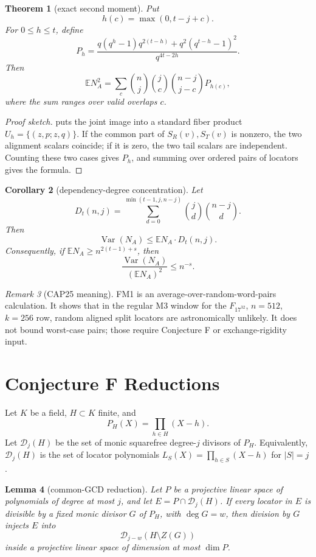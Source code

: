 \documentclass[11pt]{article}
\newtheorem{theorem}{Theorem}[section]
\newtheorem{lemma}[theorem]{Lemma}
\newtheorem{corollary}[theorem]{Corollary}
\theoremstyle{definition}
\theoremstyle{remark}
\newtheorem{remark}[theorem]{Remark}
\newcommand{\D}{\mathcal D}
\newcommand{\E}{\mathbb E}
\newcommand{\Var}{\operatorname{Var}}
\begin{document}
\begin{theorem}[exact second moment]\label{thm:second-moment}
Put
\[
        h(c)=\max(0,t-j+c).
\]
For $0\le h\le t$, define
\[
P_h=
\frac{q(q^h-1)q^{2(t-h)}+q^2(q^{t-h}-1)^2}{q^{4t-2h}}.
\]
Then
\[
\E N_A^2
=
\sum_c
\binom{n}{j}\binom{j}{c}\binom{n-j}{j-c}
P_{h(c)},
\]
where the sum ranges over valid overlaps $c$.
\end{theorem}

\begin{proof}[Proof sketch]
 puts the joint image into a standard fiber product
$U_h=\{(z,p;z,q)\}$.  If the common part of $S_R(v),S_T(v)$ is nonzero, the two
alignment scalars coincide; if it is zero, the two tail scalars are independent.
Counting these two cases gives $P_h$, and summing over ordered pairs of
locators gives the formula.
\end{proof}

\begin{corollary}[dependency-degree concentration]\label{cor:dependency}
Let
\[
        D_t(n,j)=
        \sum_{d=0}^{\min(t-1,j,n-j)}
        \binom jd\binom{n-j}{d}.
\]
Then
\[
        \Var(N_A)\le \E N_A\cdot D_t(n,j).
\]
Consequently, if $\E N_A\ge n^{2(t-1)+s}$, then
\[
        \frac{\Var(N_A)}{(\E N_A)^2}\le n^{-s}.
\]
\end{corollary}

\begin{remark}[CAP25 meaning]
FM1 is an average-over-random-word-pairs calculation.  It shows that in the
regular M3 window for the $F_{17^{32}}$, $n=512$, $k=256$ row, random aligned
split locators are astronomically unlikely.  It does not bound worst-case
pairs; those require Conjecture F or exchange-rigidity input.
\end{remark}

\section{Conjecture F Reductions}

Let $K$ be a field, $H\subset K$ finite, and
\[
        P_H(X)=\prod_{h\in H}(X-h).
\]
Let $\D_j(H)$ be the set of monic squarefree degree-$j$ divisors of $P_H$.
Equivalently, $\D_j(H)$ is the set of locator polynomials
$L_S(X)=\prod_{h\in S}(X-h)$ for $|S|=j$.

\begin{lemma}[common-GCD reduction]\label{lem:gcd}
Let $P$ be a projective linear space of polynomials of degree at most $j$, and
let $E=P\cap \D_j(H)$.  If every locator in $E$ is divisible by a fixed monic
divisor $G$ of $P_H$, with $\deg G=w$, then division by $G$ injects $E$ into
\[
        \D_{j-w}(H\setminus Z(G))
\]
inside a projective linear space of dimension at most $\dim P$.
\end{lemma}
\end{document}
